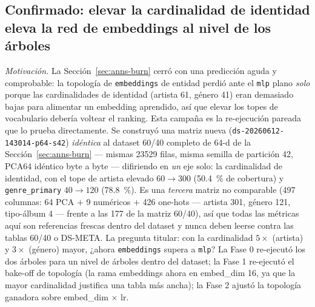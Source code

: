 \documentclass[11pt]{article}
\newcommand{\dsid}[1]{\texttt{\small #1}}
\begin{document}
\subsection{Confirmado: elevar la cardinalidad de identidad eleva la red de embeddings al nivel de los árboles}
\label{sec:anns-highvocab}
\emph{Motivación.} La Sección~\ref{sec:anns-burn} cerró con una predicción aguda y
comprobable: la topología de \texttt{embeddings} de entidad perdió ante el
\texttt{mlp} plano \emph{solo} porque las cardinalidades de identidad (artista 61,
género 41) eran demasiado bajas para alimentar un embedding aprendido, así que
elevar los topes de vocabulario debería voltear el ranking. Esta campaña es la
re-ejecución pareada que lo prueba directamente. Se construyó una matriz nueva
(\dsid{ds-20260612-143014-p64-s42}) \emph{idéntica} al dataset 60/40 completo de
64-d de la Sección~\ref{sec:anns-burn} --- mismas \num{23529} filas, misma semilla
de partición 42, PCA64 idéntico byte a byte --- difiriendo en \emph{un} eje solo:
la cardinalidad de identidad, con el tope de artista elevado $60\to300$
(\SI{50.4}{\percent} de cobertura) y \texttt{genre\_primary} $40\to120$
(\SI{78.8}{\percent}). Es una \emph{tercera} matriz no comparable (497 columnas:
64 PCA $+$ 9 numéricos $+$ 426 one-hots --- artista 301, género 121, tipo-álbum 4
--- frente a las 177 de la matriz 60/40), así que todas las métricas aquí son
referencias frescas dentro del dataset y nunca deben leerse contra las tablas
60/40 o DS-META. La pregunta titular: con la cardinalidad $5\times$ (artista) y
$3\times$ (género) mayor, ¿ahora \texttt{embeddings} supera a \texttt{mlp}? La
Fase 0 re-ejecutó los dos árboles para un nivel de árboles dentro del dataset; la
Fase 1 re-ejecutó el bake-off de topología (la rama embeddings ahora en embed\_dim
16, ya que la mayor cardinalidad justifica una tabla más ancha); la Fase 2 ajustó
la topología ganadora sobre embed\_dim $\times$ lr.
\end{document}
